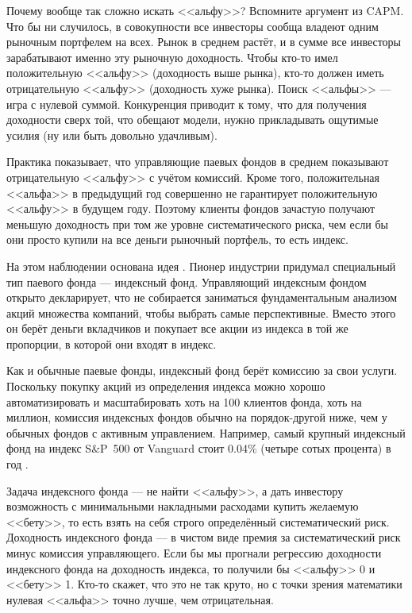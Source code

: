 Почему вообще так сложно искать <<альфу>>? Вспомните аргумент из CAPM. Что бы ни 
случилось, в совокупности все инвесторы сообща владеют одним рыночным портфелем 
на всех. Рынок в среднем растёт, и в сумме все инвесторы зарабатывают именно эту 
рыночную доходность. Чтобы кто-то имел положительную <<альфу>> (доходность выше 
рынка), кто-то должен иметь отрицательную <<альфу>> (доходность хуже рынка). 
Поиск <<альфы>> --- игра с нулевой суммой. Конкуренция приводит к тому, что 
для получения доходности сверх той, что обещают модели, нужно прикладывать 
ощутимые усилия (ну или быть довольно удачливым).

Практика показывает, что управляющие паевых фондов в среднем показывают 
отрицательную <<альфу>> с учётом комиссий. Кроме того, положительная <<альфа>> в 
предыдущий год совершенно не гарантирует положительную <<альфу>> в будущем году. 
Поэтому клиенты фондов зачастую получают меньшую доходность при том же уровне 
систематического риска, чем если бы они просто купили на все деньги рыночный 
портфель, то есть индекс.

На этом наблюдении основана идея . Пионер индустрии  придумал специальный 
тип паевого фонда --- индексный фонд. Управляющий индексным фондом открыто 
декларирует, что не собирается заниматься фундаментальным анализом акций 
множества компаний, чтобы выбрать самые перспективные. Вместо этого он берёт 
деньги вкладчиков и покупает все акции из индекса в той же пропорции, в которой 
они входят в индекс.

Как и обычные паевые фонды, индексный фонд берёт комиссию за свои услуги. 
Поскольку покупку акций из определения индекса можно хорошо автоматизировать и 
масштабировать хоть на 100 клиентов фонда, хоть на миллион, комиссия индексных 
фондов обычно на порядок-другой ниже, чем у обычных фондов с активным  
управлением. Например, самый крупный индексный фонд на индекс S\&P~500 от 
Vanguard стоит 0.04\% (четыре сотых процента) в год \cite{vanguard500}.

Задача индексного фонда --- не найти <<альфу>>, а дать инвестору возможность с 
минимальными накладными расходами купить желаемую <<бету>>, то есть взять на 
себя строго определённый систематический риск. Доходность индексного фонда --- в 
чистом виде премия за систематический риск минус комиссия управляющего. Если бы 
мы прогнали регрессию доходности индексного фонда на доходность индекса, то 
получили бы <<альфу>> 0 и <<бету>> 1. Кто-то скажет, что это не так круто, но с 
точки зрения математики нулевая <<альфа>> точно лучше, чем отрицательная.

